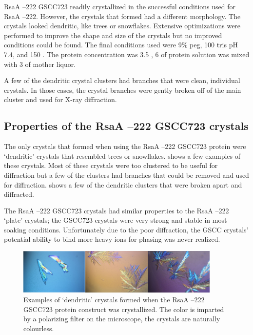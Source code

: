 RsaA --222 GSCC723 readily crystallized in the successful conditions used for RsaA --222. However, the crystals that formed had a different morphology. The crystals looked dendritic, like trees or snowflakes. Extensive optimizations were performed to improve the shape and size of the crystals but no improved conditions could be found. The final conditions used were 9\% \ac{peg}, 100 \millimolar{} tris pH 7.4, and 150 \millimolar{} . The protein concentration was 3.5 \mgperml{}, 6 \microlitre{} of protein solution was mixed with 3 \microlitre{} of mother liquor. 

A few of the dendritic crystal clusters had branches that were clean, individual crystals. In those cases, the crystal branches were gently broken off of the main cluster and used for X-ray diffraction.

\subsection{Properties of the RsaA --222 GSCC723 crystals}\label{sec:properties-rsaa-del}
The only crystals that formed when using the RsaA --222 GSCC723 protein were `dendritic' crystals that resembled trees or snowflakes.  shows a few examples of these crystals. Most of these crystals were too clustered to be useful for diffraction but a few of the clusters had branches that could be removed and used for diffraction.  shows a few of the dendritic clusters that were broken apart and diffracted. 

The RsaA --222 GSCC723 crystals had similar properties to the RsaA --222 `plate' crystals; the GSCC723 crystals were very strong and stable in
most soaking conditions. Unfortunately due to the poor diffraction, the GSCC
crystals' potential ability to bind more heavy ions for phasing was never realized.

\begin{figure}[htb]
  	\begin{center}
   		\includegraphics[width=0.9\textwidth]{crystal_chapter/img/dendroXtals.jpg}
   	\end{center}
   	\caption[Examples of unusable `dendritic' RsaA --222 GSCC723 crystals]{Examples of `dendritic' crystals formed when the RsaA --222 GSCC723 protein construct was crystallized. The color is imparted by a polarizing filter on the microscope, the crystals are naturally colourless.}
   	\label{fig:crystal-dendrites}
\end{figure}

